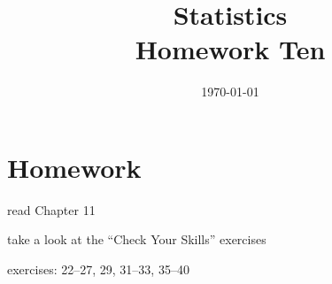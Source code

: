 \documentclass[letterpaper, landscape]{exam}
\title{Statistics \\ Homework Ten}
\date{\today}
\author{}
\begin{document}
  \maketitle

  \section{Homework}
  \ifprintanswers{}
  \else
    \begin{itemize*}
      \item read Chapter 11 
      \item take a look at the ``Check Your Skills'' exercises
      \item exercises: 22--27, 29, 31--33, 35--40
    \end{itemize*}
  \fi

  \ifprintanswers{}
\end{document}
